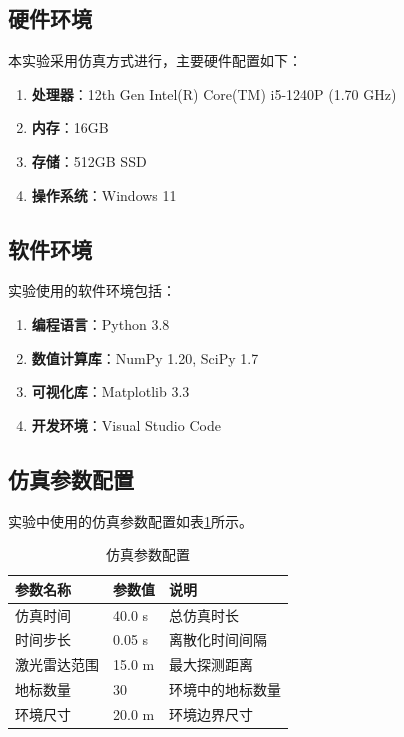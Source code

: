 \documentclass[12pt,a4paper]{report}
\begin{document}
\subsection{硬件环境}

本实验采用仿真方式进行，主要硬件配置如下：

\begin{enumerate}[itemsep=0pt]
    \item \textbf{处理器}：12th Gen Intel(R) Core(TM) i5-1240P (1.70 GHz)
    \item \textbf{内存}：16GB 
    \item \textbf{存储}：512GB SSD
    \item \textbf{操作系统}：Windows 11
\end{enumerate}

\subsection{软件环境}

实验使用的软件环境包括：

\begin{enumerate}[itemsep=0pt]
    \item \textbf{编程语言}：Python 3.8
    \item \textbf{数值计算库}：NumPy 1.20, SciPy 1.7
    \item \textbf{可视化库}：Matplotlib 3.3
    \item \textbf{开发环境}：Visual Studio Code

\end{enumerate}

\subsection{仿真参数配置}

实验中使用的仿真参数配置如表\ref{tab:sim_params}所示。

\begin{table}[H]
\centering
\caption{仿真参数配置}
\label{tab:sim_params}
\begin{tabular}{lll}
\toprule
\textbf{参数名称} & \textbf{参数值} & \textbf{说明} \\
\midrule
仿真时间 & 40.0 s & 总仿真时长 \\
时间步长 & 0.05 s & 离散化时间间隔 \\
激光雷达范围 & 15.0 m & 最大探测距离 \\
地标数量 & 30 & 环境中的地标数量 \\
环境尺寸 & 20.0 m & 环境边界尺寸 \\
\bottomrule
\end{tabular}
\end{table}
\end{document}
